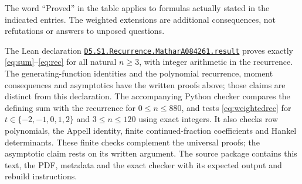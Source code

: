 \documentclass[11pt]{article}
\begin{document}
The word ``Proved'' in the table applies to formulas actually stated
in the indicated entries. The weighted extensions are additional
consequences, not refutations or answers to unposed questions.

The Lean declaration
\href{https://github.com/the-omega-institute/trureturing/blob/b0f7c01b01511ea00428c1b6edad5dd2b372eaf8/D5/S1/Recurrence/MatharA084261.lean}
{\texttt{D5.S1.Recurrence.MatharA084261.result}}
proves exactly \eqref{eq:sum}--\eqref{eq:rec} for all natural $n\geq3$,
with integer arithmetic in the recurrence. The generating-function identities
and the polynomial recurrence, moment consequences and asymptotics have
the written proofs above; those claims are distinct from this declaration.
The accompanying Python checker compares the defining sum with the recurrence
for $0\leq n\leq880$, and tests \eqref{eq:weightedrec} for
$t\in\{-2,-1,0,1,2\}$ and $3\leq n\leq120$ using exact integers.
It also checks row polynomials, the Appell identity, finite continued-fraction
coefficients and Hankel determinants. These finite checks complement
the universal proofs; the asymptotic claim rests on its written argument.
The source package contains this text, the PDF, metadata and the exact
checker with its expected output and rebuild instructions.
\end{document}
